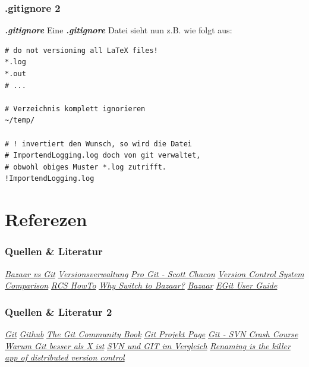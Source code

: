 \documentclass{beamer}
\begin{document}
\begin{frame}[fragile]\frametitle{.gitignore 2}
\begin{block} {\textbf{\textit{.gitignore}}}
Eine \textbf{\textit{.gitignore}} Datei sieht nun z.B. wie folgt aus:
\begin{lstlisting}[mathescape=true]
# do not versioning all LaTeX files!
*.log
*.out
# ...

# Verzeichnis komplett ignorieren
~/temp/

# ! invertiert den Wunsch, so wird die Datei 
# ImportendLogging.log doch von git verwaltet, 
# obwohl obiges Muster *.log zutrifft. 
!ImportendLogging.log
\end{lstlisting}
\end{block}
\end{frame}

\section[Quellen]{Referezen}

\begin{frame}\frametitle{Quellen \& Literatur}
\begin{thebibliography}{9}
 \emph{\href{http://wiki.bazaar.canonical.com/BzrVsGit}{Bazaar vs Git}}
 \emph{\href{http://de.wikipedia.org/wiki/Versionsverwaltung}{Versionsverwaltung}}
 \emph{\href{http://progit.org/}{Pro Git - Scott Chacon}}
 \emph{\href{http://better-scm.shlomifish.org/comparison/comparison.html}{Version Control System Comparison}}
 \emph{\href{http://www.madboa.com/geek/rcs/} {RCS HowTo}}
 \emph{\href{http://doc.bazaar.canonical.com/migration/en/why-switch-to-bazaar.html}{Why Switch to Bazaar?}}
 \emph{\href{http://wiki.ubuntuusers.de/Bazaar}{Bazaar}}
 \emph{\href{http://wiki.eclipse.org/EGit/User\_Guide} {EGit User Guide}}
\end{thebibliography}
\end{frame}

\begin{frame}\frametitle{Quellen \& Literatur 2}
\begin{thebibliography}{9}
 \emph{\href{http://wiki.ubuntuusers.de/Git}{Git}}
 \emph{\href{https://github.com/features/projects}{Github}}
 \emph{\href{http://book.git-scm.com/index.html}{The Git Community Book}}
 \emph{\href{http://git-scm.com/}{Git Projekt Page}}
 \emph{\href{http://git.or.cz/course/svn.html}{Git - SVN Crash Course}}
 \emph{\href{http://de.whygitisbetterthanx.com/}{Warum Git besser als X ist}}
 \emph{\href{http://velian.dyndns.org/mediawiki/index.php/SVN\_und\_GIT\_im\_Vergleich}{SVN und GIT im Vergleich}}
 \emph{\href{http://www.markshuttleworth.com/archives/123}{Renaming is the killer app of distributed version control}}
\end{thebibliography}
\end{frame}
\end{document}
